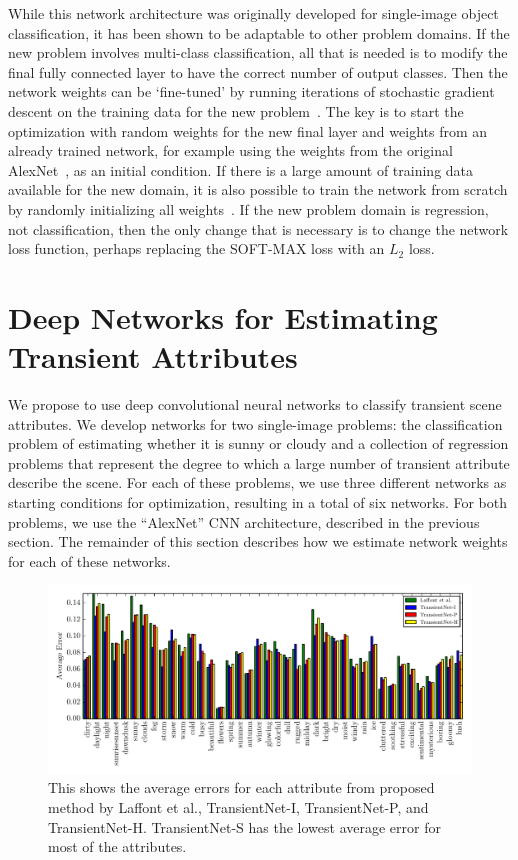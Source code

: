 \documentclass{article}
\begin{document}
While this network architecture was originally developed for
single-image object classification, it has been shown to be adaptable
to other problem domains. If the new problem involves multi-class
classification, all that is needed is to modify the final fully
connected layer to have the correct number of output classes. Then the
network weights can be `fine-tuned' by running iterations of stochastic
gradient descent on the training data for the new 
problem~\cite{yosinski2014transferable}.  The key is
to start the optimization with random weights for the new final layer
and weights from an already trained network, for example using the
weights from the original AlexNet~\cite{caffenetnips12}, as an initial
condition. If there is a large amount of
training data available for the new domain, it is also possible to
train the network from scratch by randomly initializing all
weights~\cite{zhou2014places}.  If the new problem domain is
regression, not classification, then the only change that is necessary
is to change the network loss function, perhaps replacing the SOFT-MAX
loss with an $L_2$ loss.

\section{Deep Networks for Estimating Transient Attributes}
\indent

We propose to use deep convolutional neural networks to classify
transient scene attributes. We develop networks for two single-image
problems: the classification problem of estimating whether it is sunny
or cloudy and a collection of regression problems that
represent the degree to which a large number of transient attribute
describe the scene.  For each of these problems, we
use three different networks as starting conditions for optimization,
resulting in a total of six networks.  For both problems, we use the
``AlexNet'' CNN architecture, described in the previous section.  The
remainder of this section describes how we estimate network weights
for each of these networks.

\begin{figure}[t!]
	\centering
		\includegraphics[width=1.0\textwidth, trim= 0 8mm 0 0]{figs/avg_err_compare_cmr.pdf}
		\caption{This shows the average errors for each attribute from proposed method
						 by Laffont et al., TransientNet-I, TransientNet-P, and TransientNet-H.  
             TransientNet-S has the lowest average error for most of the attributes.}
		\label{fig:compare}
\end{figure}
\end{document}
